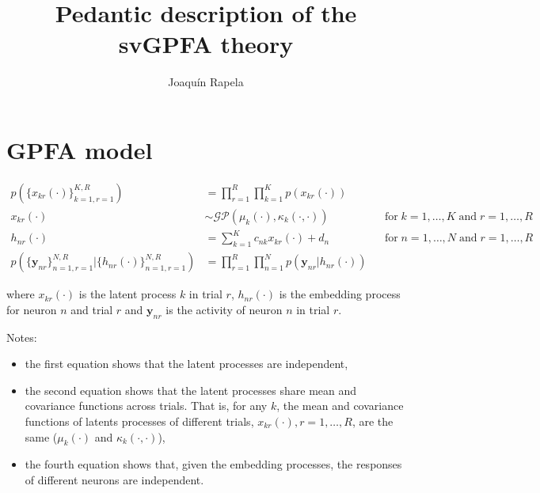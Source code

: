 \documentclass[12pt]{article}
\title{Pedantic description of the svGPFA theory}
\author{Joaqu\'{i}n Rapela}
\begin{document}
\maketitle


\section{GPFA model}

\begin{equation}
    \begin{aligned}
        p(\{x_{kr}(\cdot)\}_{k=1,r=1}^{K,R}) &= \prod_{r=1}^R\prod_{k=1}^Kp(x_{kr}(\cdot))\\
        x_{kr}(\cdot) &\sim \mathcal{GP}(\mu_k(\cdot),\kappa_k(\cdot,\cdot))&&{\text{for}\; k=1, \ldots, K\;\text{and}\;r=1,\ldots, R}\\
        h_{nr}(\cdot) &= \sum_{k=1}^Kc_{nk}x_{kr}(\cdot) + d_n&&{\text{for}\; n=1, \ldots, N\;\text{and}\;r=1,\ldots, R}\\
        p(\{\mathbf{y}_{nr}\}_{n=1,r=1}^{N,R}|\{h_{nr}(\cdot)\}_{n=1,r=1}^{N,R}) &= \prod_{r=1}^R\prod_{n=1}^Np(\mathbf{y}_{nr}|h_{nr}(\cdot))
    \end{aligned}
    \label{eq:gpfaModel}
\end{equation}

\noindent where $x_{kr}(\cdot)$ is the latent process $k$ in trial $r$, $h_{nr}(\cdot)$ is the embedding process for neuron $n$ and trial $r$ and $\mathbf{y}_{nr}$ is the activity of neuron $n$ in trial $r$.

Notes:

\begin{itemize}

    \item the first equation shows that the latent processes are independent,

    \item the second equation shows that the latent processes share mean and
        covariance functions across trials. That is, for any $k$, the mean and
        covariance functions  of latents processes of different trials,
        $x_{kr}(\cdot), r=1,\ldots, R$, are the same ($\mu_k(\cdot)$ and
        $\kappa_k(\cdot,\cdot)$),

    \item the fourth equation shows that, given the embedding processes, the
        responses of different neurons are independent.

\end{itemize}
\end{document}
